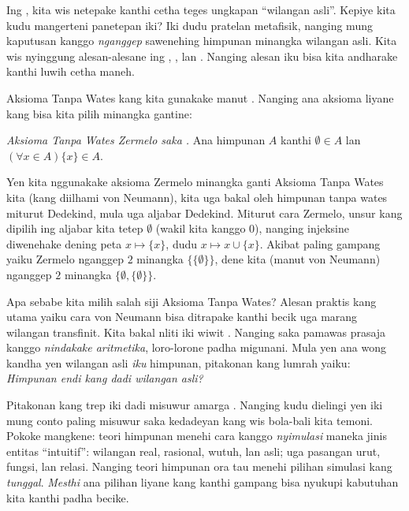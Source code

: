 \documentclass[../../../include/open-logic-section]{subfiles}
\begin{document}
	


Ing , kita wis netepake
kanthi cetha teges ungkapan ``wilangan asli''. Kepiye
kita kudu mangerteni panetepan iki? Iki dudu
pratelan metafisik, nanging mung kaputusan kanggo
\emph{nganggep} sawenehing himpunan minangka wilangan asli.
Kita wis nyinggung alesan-alesane ing
, , lan
. Nanging alesan
iku bisa kita andharake kanthi luwih cetha maneh.

Aksioma Tanpa Wates kang kita gunakake manut
\citet{VonNeumann1925}. Nanging ana aksioma liyane kang
bisa kita pilih minangka gantine:

\begin{defish}
\emph{Aksioma Tanpa Wates Zermelo saka
\citeyear{Zermelo1908Untersuchungen}.} Ana himpunan $A$
kanthi $\emptyset \in A$ lan $(\forall x \in A)\{x\} \in A$.
\end{defish}

Yen kita nggunakake aksioma Zermelo minangka ganti
Aksioma Tanpa Wates kita (kang diilhami von Neumann),
kita uga bakal oleh himpunan tanpa wates miturut Dedekind,
mula uga aljabar Dedekind. Miturut cara Zermelo, unsur
kang dipilih ing aljabar kita tetep $\emptyset$ (wakil
kita kanggo $0$), nanging injeksine diwenehake dening
peta $x \mapsto \{x\}$, dudu $x \mapsto x \cup \{x\}$.
Akibat paling gampang yaiku Zermelo nganggep $2$ minangka
$\{\{\emptyset\}\}$, dene kita (manut von Neumann)
nganggep $2$ minangka $\{\emptyset, \{\emptyset\}\}$.

Apa sebabe kita milih salah siji Aksioma Tanpa Wates?
Alesan praktis kang utama yaiku cara von Neumann bisa
ditrapake kanthi becik uga marang wilangan transfinit.
Kita bakal nliti iki wiwit
. Nanging saka pamawas
prasaja kanggo \emph{nindakake aritmetika}, loro-lorone
padha migunani. Mula yen ana wong kandha yen wilangan
asli \emph{iku} himpunan, pitakonan kang lumrah yaiku:
\emph{Himpunan endi kang dadi wilangan asli?}

Pitakonan kang trep iki dadi misuwur amarga
\citet{Benacerraf1965}. Nanging kudu dielingi yen iki
mung conto paling misuwur saka kedadeyan kang wis bola-bali
kita temoni. Pokoke mangkene: teori himpunan menehi cara
kanggo \emph{nyimulasi} maneka jinis entitas ``intuitif'':
wilangan real, rasional, wutuh, lan asli; uga pasangan
urut, fungsi, lan relasi. Nanging teori himpunan ora tau
menehi pilihan simulasi kang \emph{tunggal}. \emph{Mesthi}
ana pilihan liyane kang kanthi gampang bisa nyukupi
kabutuhan kita kanthi padha becike.
\end{document}
